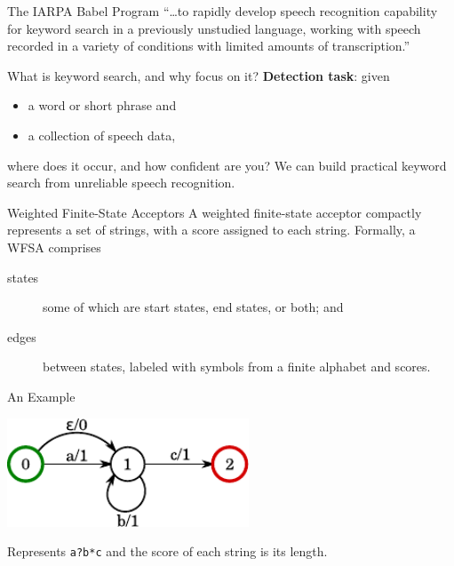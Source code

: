 \begin{frame}{The IARPA Babel Program}{}
  \Large{``\ldots to rapidly develop speech recognition
    capability for \alert{keyword search} in a previously unstudied
    language, working with speech recorded in a variety of
    conditions with limited amounts of transcription.''}\par
\end{frame}

\begin{frame}{What is keyword search, and why focus on it?}{}
  {\bf Detection task}: given
    \begin{itemize}
    \item a word or short phrase and
    \item a collection of speech data,
    \end{itemize}
    \alert{where} does it occur, and \alert{how confident} are you?
    \vfill
    We can build \alert{practical} keyword search from
    \alert{unreliable} speech recognition.
\end{frame}

\begin{frame}{Weighted Finite-State Acceptors}{}
  A \alert{weighted finite-state acceptor} compactly represents a set
  of strings, with a score assigned to each string.
  \vfill
  Formally, a WFSA comprises
  \begin{description}
  \item[states] some of which are start states, end states, or both;
    and
  \item[edges] between states, labeled with symbols from a finite
    alphabet and scores.
  \end{description}
\end{frame}

\begin{frame}{An Example}{}
  \begin{center}
    \includegraphics[width=72mm]{figures/WFSA}
  \end{center}
  \vfill
  Represents {\tt a?b*c} and the score of each string is its length.
\end{frame}

